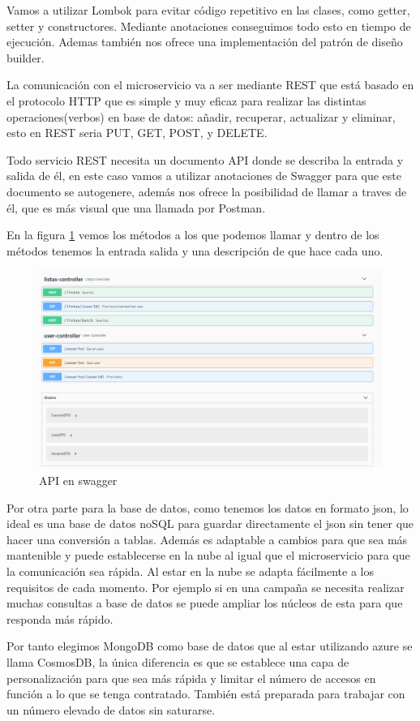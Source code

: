 \documentclass[12pt]{report} %
\begin{document}
Vamos a utilizar Lombok para evitar código repetitivo en las clases, como getter, setter y constructores. Mediante anotaciones conseguimos todo esto en tiempo de ejecución. Ademas también nos ofrece una implementación del patrón de diseño builder.

La comunicación con el microservicio va a ser mediante REST que está basado en el protocolo HTTP que es simple y muy eficaz para realizar las distintas operaciones(verbos) en base de datos: añadir, recuperar, actualizar y eliminar, esto en REST seria PUT, GET, POST, y DELETE.

Todo servicio REST necesita un documento API donde se describa la entrada y salida de él, en este caso vamos a utilizar anotaciones de Swagger para que este documento se autogenere, además nos ofrece la posibilidad de llamar a traves de él, que es más visual que una llamada por Postman.

En la figura \ref{fig:capturaswagger} vemos los métodos a los que podemos llamar y dentro de los métodos tenemos la entrada salida y una descripción de que hace cada uno.
\begin{figure}
	\centering
	\includegraphics[width=0.7\linewidth]{imagenes/CapturaSwagger}
	\caption{API en swagger}
	\label{fig:capturaswagger}
\end{figure}


Por otra parte para la base de datos, como tenemos los datos en formato json, lo ideal es una base de datos noSQL para guardar directamente el json sin tener que hacer una conversión a tablas. Además es adaptable a cambios para que sea más mantenible y puede establecerse en la nube al igual que el microservicio para que la comunicación sea rápida. Al estar en la nube se adapta fácilmente a los requisitos de cada momento. Por ejemplo si en una campaña se necesita realizar muchas consultas a base de datos se puede ampliar los núcleos de esta para que responda más rápido.

Por tanto elegimos MongoDB como base de datos que al estar utilizando azure se llama CosmosDB, la única diferencia es que se establece una capa de personalización para que sea más rápida y limitar el número de accesos en función a lo que se tenga contratado. También está preparada para trabajar con un número elevado de datos sin saturarse.
\end{document}

